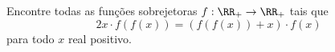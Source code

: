 Encontre todas as funções sobrejetoras $f: \RR_+ \to \RR_+$ tais que
$$2x \cdot f(f(x)) = (f(f(x)) + x) \cdot f(x)$$
para todo $x$ real positivo.
